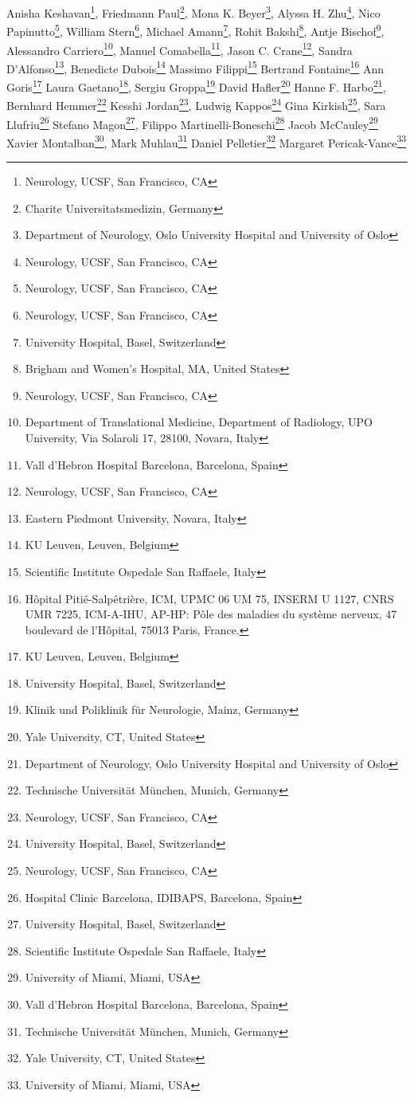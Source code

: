 \iflatexml
Anisha Keshavan\footnote[1]{Neurology, UCSF, San Francisco, CA},
Friedmann Paul\footnote[2]{Charite Universitatsmedizin, Germany},
Mona K. Beyer\footnote[3]{Department of Neurology, Oslo University Hospital and University of Oslo},
Alyssa H. Zhu\footnote[1]{Neurology, UCSF, San Francisco, CA},
Nico Papinutto\footnote[1]{Neurology, UCSF, San Francisco, CA},
William Stern\footnote[1]{Neurology, UCSF, San Francisco, CA},
Michael Amann\footnote[13]{University Hospital, Basel, Switzerland},
Rohit Bakshi\footnote[4]{Brigham and Women's Hospital, MA, United States},
Antje Bischof\footnote[1]{Neurology, UCSF, San Francisco, CA},
Alessandro Carriero\footnote[1]{Department of Translational Medicine, Department of Radiology,  UPO University, Via Solaroli 17, 28100, Novara, Italy},
Manuel Comabella\footnote[5]{Vall d’Hebron Hospital Barcelona, Barcelona, Spain},
Jason C. Crane\footnote[1]{Neurology, UCSF, San Francisco, CA},
Sandra D’Alfonso\footnote[6]{Eastern Piedmont University, Novara, Italy},
Benedicte Dubois\footnote[7]{KU Leuven, Leuven, Belgium}
Massimo Filippi\footnote[8]{Scientific Institute Ospedale San Raffaele, Italy}
Bertrand Fontaine\footnote[9]{Hôpital Pitié-Salpêtrière, ICM, UPMC 06 UM 75, INSERM U 1127, CNRS UMR 7225, ICM-A-IHU, AP-HP:  
Pôle des maladies du système nerveux, 47 boulevard de l'Hôpital, 75013  
Paris, France.}
Ann Goris\footnote[7]{KU Leuven, Leuven, Belgium}
Laura Gaetano\footnote[13]{University Hospital, Basel, Switzerland},
Sergiu Groppa\footnote[10]{Klinik und Poliklinik für Neurologie, Mainz, Germany}
David Hafler\footnote[11]{Yale University, CT, United States}
Hanne F. Harbo\footnote[3]{Department of Neurology, Oslo University Hospital and University of Oslo},
Bernhard Hemmer\footnote[12]{Technische Universität München, Munich, Germany}
Kesshi Jordan\footnote[1]{Neurology, UCSF, San Francisco, CA},
Ludwig Kappos\footnote[13]{University Hospital, Basel, Switzerland}
Gina Kirkish\footnote[1]{Neurology, UCSF, San Francisco, CA},
Sara Llufriu\footnote[14]{Hospital Clinic Barcelona, IDIBAPS, Barcelona, Spain}
Stefano Magon\footnote[13]{University Hospital, Basel, Switzerland},
Filippo Martinelli-Boneschi\footnote[8]{Scientific Institute Ospedale San Raffaele, Italy}
Jacob McCauley\footnote[15]{University of Miami, Miami, USA}
Xavier Montalban\footnote[5]{Vall d’Hebron Hospital Barcelona, Barcelona, Spain},
Mark Muhlau\footnote[12]{Technische Universität München, Munich, Germany}
Daniel Pelletier\footnote[11]{Yale University, CT, United States}
Margaret Pericak-Vance\footnote[15]{University of Miami, Miami, USA}

